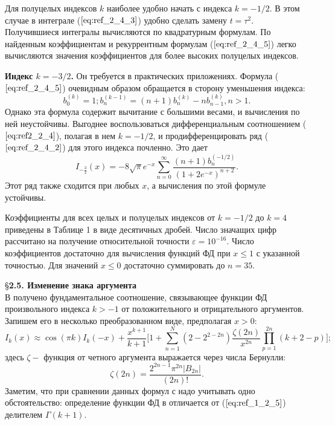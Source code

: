 Для полуцелых индексов $k$ наиболее удобно начать с индекса \linebreak $k = -1/2$. В
этом случае в интеграле ($\ref{eq:ref_2_4_3}$) удобно сделать замену $t = \tau^2$. Получившиеся
интегралы вычисляются по квадратурным формулам. По найденным
коэффициентам и рекуррентным формулам ($\ref{eq:ref_2_4_5}$) легко вычисляются значения
коэффициентов для более высоких полуцелых индексов.

\textbf{Индекс $k = -3/2$.} Он требуется в практических приложениях. Формула
($\ref{eq:ref_2_4_5}$) очевидным образом обращается в сторону уменьшения индекса:
\begin{equation}
b_0^{(k)}=1;b_n^(k-1)=(n+1)b_n^{(k)}-nb_{n-1}^{(k)}, n > 1.
\label{eq:ref_2_4_11}
\end{equation}
Однако эта формула содержит вычитание с большими весами, и вычисления по
ней неустойчивы. Выгоднее воспользоваться дифференциальным
соотношением ($\ref{eq:ref2_2_4}$), полагая в нем $k = -1/2$, и продифференцировать ряд ($\ref{eq:ref_2_4_2}$) для
этого индекса почленно. Это дает
\begin{equation}
I_{-\frac{3}{2}}(x)=-8\sqrt{\pi}e^{-x}\sum\limits_{n=0}^{\infty} \frac{(n+1)b_n^{(-1/2)}}{(1+2e^{-x})^{n+2}}.
\label{eq:ref_2_4_12}
\end{equation}
Этот ряд также сходится при любых $x$, а вычисления по этой формуле
устойчивы.

Коэффициенты для всех целых и полуцелых индексов от $k = -1/2$ до $k = 4$
приведены в Таблице 1 в виде десятичных дробей. Число значащих цифр
рассчитано на получение относительной точности $\varepsilon = 10^{-16}$. Число
коэффициентов достаточно для вычисления функций ФД при $x \leqslant 1$ с указанной
точностью. Для значений $x \leqslant 0$ достаточно суммировать до $n = 35$.



\S \textbf{2.5. Изменение знака аргумента}
\\

В \cite{Glasser} получено фундаментальное соотношение, связывающее функции ФД
произвольного индекса $k > -1$ от положительного и отрицательного
аргументов. Запишем его в несколько преобразованном виде, предполагая
$x > 0$:
\begin{equation}
I_k(x) \approx \cos(\pi k)I_k(-x)+ \frac{x^{k+1}}{k+1}\Bigg[ 1+\sum\limits_{n=1}^N (2-2^{2-2n}) \frac{\zeta (2n)}{x^{2n}}  \prod\limits_{p=1}^{2n} (k+2-p) \Bigg];
\label{eq:ref_2_5_1}
\end{equation}
здесь $\zeta -$ функция от четного аргумента выражается через числа Бернулли:
\begin{equation}
\zeta(2n)= \frac{2^{2n-1} \pi^{2n} |B_{2n}|}{(2n)!}.
\label{eq:ref_2_5_2}
\end{equation}
Заметим, что при сравнении данных формул с \cite{Glasser} надо учитывать одно
обстоятельство: определение функции ФД в \cite{Glasser} отличается от ($\ref{eq:ref_1_2_5}$) делителем $\Gamma(k + 1)$.

